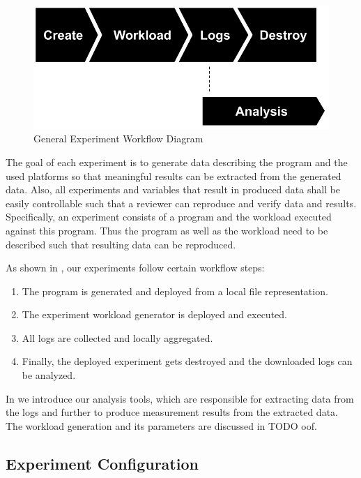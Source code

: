 \documentclass[../main.tex]{subfiles}
\begin{document}
\begin{figure}
\begin{center}
  \includegraphics[width=\linewidth,keepaspectratio]{./workflow-diagram.png}
\end{center}
\caption{General Experiment Workflow Diagram}%
\label{fig:experimentWorkflowDiagram}
\end{figure}

The goal of each experiment is to generate data describing the program and the used platforms 
so that meaningful results can be extracted from the generated data. 
Also, all experiments and variables that result in produced data shall be easily controllable 
such that a reviewer can reproduce and verify data and results.
Specifically, an experiment consists of a program and the workload executed against this program. 
Thus the program as well as the workload need to be described such that resulting data can be reproduced.

As shown in , our experiments follow certain workflow steps: 
\begin{enumerate}
  \item The program is generated and deployed from a local file representation.
  \item The experiment workload generator is deployed and executed.
  \item All logs are collected and locally aggregated.
  \item Finally, the deployed experiment gets destroyed and the downloaded logs can be analyzed.
\end{enumerate}
In  we introduce our analysis tools, which are responsible for 
extracting data from the logs and further to produce measurement results from the extracted data.
The workload generation and its parameters are discussed in TODO oof.

\subsection{Experiment Configuration}\label{sec:experimentConfig}
\end{document}
